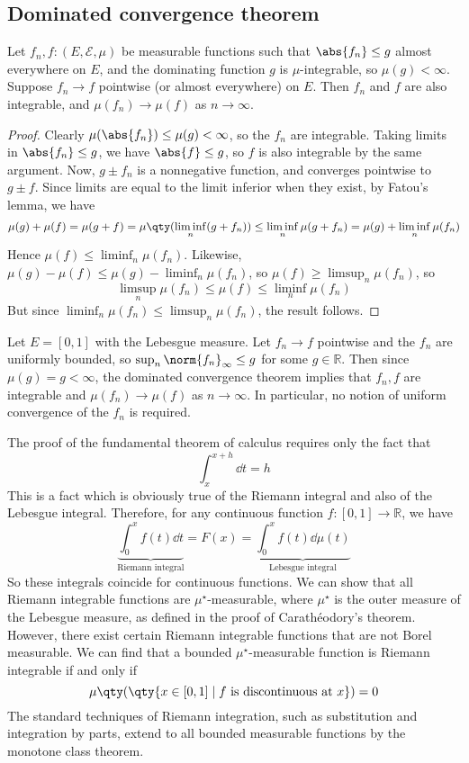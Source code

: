 \subsection{Dominated convergence theorem}
\begin{theorem}
	Let $f_n, f \colon (E, \mathcal E, \mu)$ be measurable functions such that $\abs{f_n} \leq g$ almost everywhere on $E$, and the dominating function $g$ is $\mu$-integrable, so $\mu(g) < \infty$.
	Suppose $f_n \to f$ pointwise (or almost everywhere) on $E$.
	Then $f_n$ and $f$ are also integrable, and $\mu(f_n) \to \mu(f)$ as $n \to \infty$.
\end{theorem}
\begin{proof}
	Clearly $\mu(\abs{f_n}) \leq \mu(g) < \infty$, so the $f_n$ are integrable.
	Taking limits in $\abs{f_n} \leq g$, we have $\abs{f} \leq g$, so $f$ is also integrable by the same argument.
	Now, $g \pm f_n$ is a nonnegative function, and converges pointwise to $g \pm f$.
	Since limits are equal to the limit inferior when they exist, by Fatou's lemma, we have
	\[ \mu(g) + \mu(f) = \mu(g + f) = \mu\qty(\liminf_n (g + f_n)) \leq \liminf_n \mu(g + f_n) = \mu(g) + \liminf_n \mu(f_n) \]
	Hence $\mu(f) \leq \liminf_n \mu(f_n)$.
	Likewise, $\mu(g) - \mu(f) \leq \mu(g) - \liminf_n \mu(f_n)$, so $\mu(f) \geq \limsup_n \mu(f_n)$, so
	\[ \limsup_n \mu(f_n) \leq \mu(f) \leq \liminf_n \mu(f_n) \]
	But since $\liminf_n \mu(f_n) \leq \limsup_n \mu(f_n)$, the result follows.
\end{proof}
\begin{example}
	Let $E = [0,1]$ with the Lebesgue measure.
	Let $f_n \to f$ pointwise and the $f_n$ are uniformly bounded, so $\sup_n \norm{f_n}_\infty \leq g$ for some $g \in \mathbb R$.
	Then since $\mu(g) = g < \infty$, the dominated convergence theorem implies that $f_n, f$ are integrable and $\mu(f_n) \to \mu(f)$ as $n \to \infty$.
	In particular, no notion of uniform convergence of the $f_n$ is required.
\end{example}
\begin{remark}
	The proof of the fundamental theorem of calculus requires only the fact that
	\[ \int_x^{x + h} \dd{t} = h \]
	This is a fact which is obviously true of the Riemann integral and also of the Lebesgue integral.
	Therefore, for any continuous function $f \colon [0,1] \to \mathbb R$, we have
	\[ \underbrace{\int_0^x f(t) \dd{t}}_{\text{Riemann integral}} = F(x) = \underbrace{\int_0^x f(t) \dd{\mu(t)}}_{\text{Lebesgue integral}} \]
	So these integrals coincide for continuous functions.
	We can show that all Riemann integrable functions are $\mu^\star$-measurable, where $\mu^\star$ is the outer measure of the Lebesgue measure, as defined in the proof of Carath\'eodory's theorem.
	However, there exist certain Riemann integrable functions that are not Borel measurable.
	We can find that a bounded $\mu^\star$-measurable function is Riemann integrable if and only if
	\[ \mu\qty(\qty{x \in [0,1] \mid f \text{ is discontinuous at } x}) = 0 \]
	The standard techniques of Riemann integration, such as substitution and integration by parts, extend to all bounded measurable functions by the monotone class theorem.
\end{remark}
